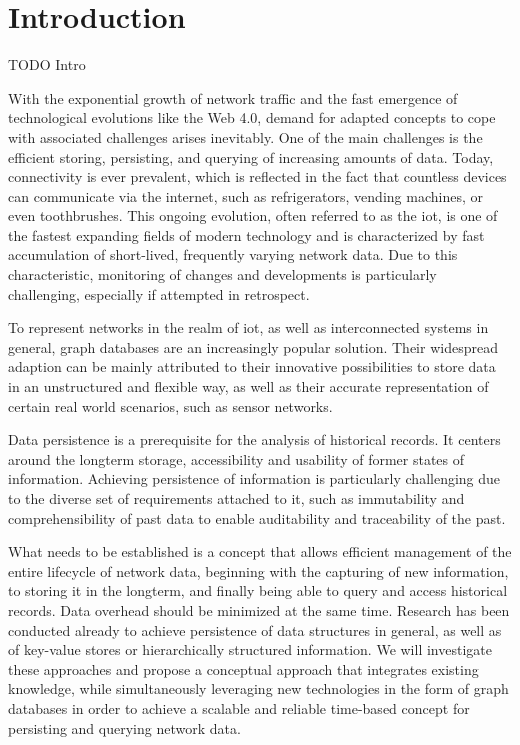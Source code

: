 
\chapter{Introduction}
\label{ch:introduction}

TODO Intro

With the exponential growth of network traffic and the fast emergence of technological evolutions like the Web 4.0, demand for adapted concepts to cope with associated challenges arises inevitably.
One of the main challenges is the efficient storing, persisting, and querying of increasing amounts of data.
Today, connectivity is ever prevalent, which is reflected in the fact that countless devices can communicate via the internet, such as refrigerators, vending machines, or even toothbrushes.
This ongoing evolution, often referred to as the \ac{iot}, is one of the fastest expanding fields of modern technology and is characterized by fast accumulation of short-lived, frequently varying network data.
Due to this characteristic, monitoring of changes and developments is particularly challenging, especially if attempted in retrospect.

To represent networks in the realm of \ac{iot}, as well as interconnected systems in general, graph databases are an increasingly popular solution.
Their widespread adaption can be mainly attributed to their innovative possibilities to store data in an unstructured and flexible way, as well as their accurate representation of certain real world scenarios, such as sensor networks.

Data persistence is a prerequisite for the analysis of historical records.
It centers around the longterm storage, accessibility and usability of former states of information.
Achieving persistence of information is particularly challenging due to the diverse set of requirements attached to it, such as immutability and comprehensibility of past data to enable auditability and traceability of the past.

What needs to be established is a concept that allows efficient management of the entire lifecycle of network data, beginning with the capturing of new information, to storing it in the longterm, and finally being able to query and access historical records.
Data overhead should be minimized at the same time.
Research has been conducted already to achieve persistence of data structures in general, as well as of key-value stores or hierarchically structured information.
We will investigate these approaches and propose a conceptual approach that integrates existing knowledge, while simultaneously leveraging new technologies in the form of graph databases in order to achieve a scalable and reliable time-based concept for persisting and querying network data.

